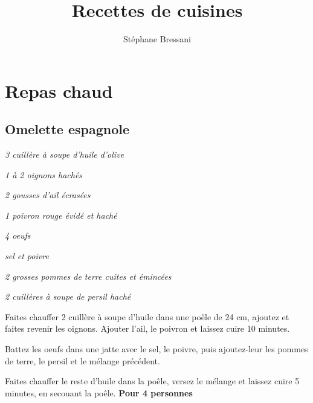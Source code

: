 \documentclass[10pt,a4paper]{report}
\author{Stéphane Bressani}
\title{Recettes de cuisines}
\begin{document}
    \maketitle
    \tableofcontents

    \chapter{Repas chaud}
    \section{Omelette espagnole}

    \begin{multicols}{2}
        \parbox[1cm]{\textwidth}{
            \begin{description}
                \item \textit{3 cuillère à soupe d'huile d'olive}
                \item \textit{1 à 2 oignons hachés}
                \item \textit{2 gousses d'ail écrasées}
                \item \textit{1 poivron rouge évidé et haché}
                \item \textit{4 oeufs}
                \item \textit{sel et poivre}
                \item \textit{2 grosses pommes de terre cuites et émincées}
                \item \textit{2 cuillères à soupe de persil haché}
            \end{description}
        }
        \columnbreak

        Faites chauffer 2 cuillère à soupe d'huile dans une poêle de 24 cm, ajoutez et faites revenir les oignons. Ajouter l'ail, le poivron et laissez cuire 10 minutes.
        \newline

        Battez les oeufs dans une jatte avec le sel, le poivre, puis ajoutez-leur les pommes de terre, le persil et le mélange précédent.
        \newline

        Faites chauffer le reste d'huile dans la poêle, versez le mélange et laissez cuire 5 minutes, en secouant la poêle.
        \newline
        \newline
        \textbf{Pour 4 personnes}
    \end{multicols}
\end{document}
